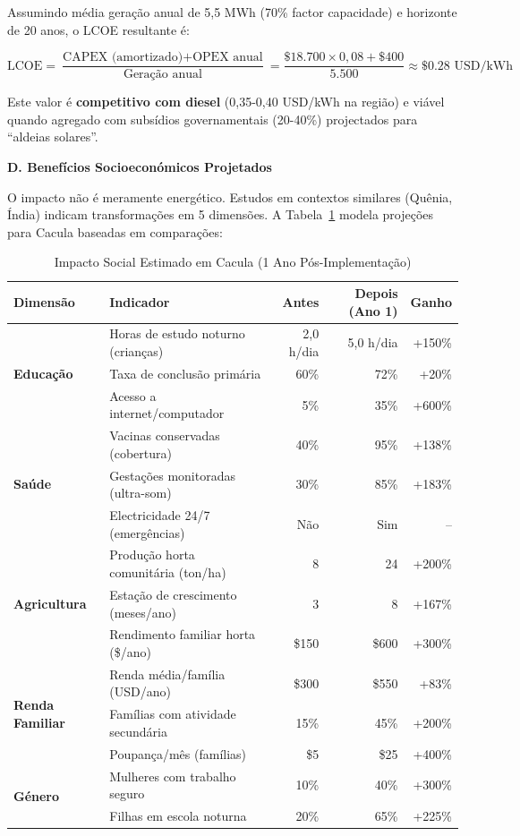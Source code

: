 \documentclass[12pt, a4paper]{article}
\begin{document}
Assumindo média geração anual de 5,5 MWh (70\% factor capacidade) e horizonte de 
20 anos, o LCOE resultante é:

\[
\text{LCOE} = \frac{\text{CAPEX (amortizado)} + \text{OPEX anual}}{\text{Geração anual}} 
           = \frac{\$18.700 \times 0,08 + \$400}{5.500} \approx \$0.28\text{ USD/kWh}
\]

Este valor é \textbf{competitivo com diesel} (0,35-0,40 USD/kWh na região) e viável 
quando agregado com subsídios governamentais (20-40\%) projectados para ``aldeias solares''.

\textbf{D. Benefícios Socioeconómicos Projetados}

O impacto não é meramente energético. Estudos em contextos similares (Quênia, Índia) 
indicam transformações em 5 dimensões. A Tabela~\ref{tab:cacula_impact} modela projeções 
para Cacula baseadas em comparações:

\begin{table}[H]
\centering
\caption{Impacto Social Estimado em Cacula (1 Ano Pós-Implementação)}
\label{tab:cacula_impact}
\small
\begin{tabular}{|l|l|r|r|r|}
\hline
\textbf{Dimensão} & \textbf{Indicador} & \textbf{Antes} & \textbf{Depois (Ano 1)} & \textbf{Ganho} \\
\hline
\multirow{3}{*}{\textbf{Educação}} 
  & Horas de estudo noturno (crianças) & 2,0 h/dia & 5,0 h/dia & +150\% \\
  & Taxa de conclusão primária & 60\% & 72\% & +20\% \\
  & Acesso a internet/computador & 5\% & 35\% & +600\% \\
\hline
\multirow{3}{*}{\textbf{Saúde}}
  & Vacinas conservadas (cobertura) & 40\% & 95\% & +138\% \\
  & Gestações monitoradas (ultra-som) & 30\% & 85\% & +183\% \\
  & Electricidade 24/7 (emergências) & Não & Sim & -- \\
\hline
\multirow{3}{*}{\textbf{Agricultura}}
  & Produção horta comunitária (ton/ha) & 8 & 24 & +200\% \\
  & Estação de crescimento (meses/ano) & 3 & 8 & +167\% \\
  & Rendimento familiar horta (\$/ano) & \$150 & \$600 & +300\% \\
\hline
\multirow{3}{*}{\textbf{Renda Familiar}}
  & Renda média/família (USD/ano) & \$300 & \$550 & +83\% \\
  & Famílias com atividade secundária & 15\% & 45\% & +200\% \\
  & Poupança/mês (famílias) & \$5 & \$25 & +400\% \\
\hline
\multirow{2}{*}{\textbf{Género}}
  & Mulheres com trabalho seguro & 10\% & 40\% & +300\% \\
  & Filhas em escola noturna & 20\% & 65\% & +225\% \\
\hline
\end{tabular}
\end{table}
\end{document}
